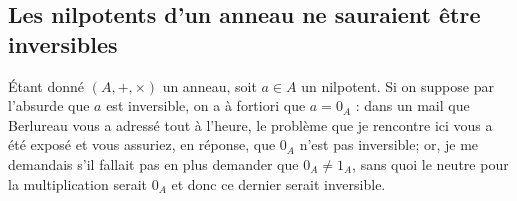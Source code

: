 \documentclass[17pt]{article}
\begin{document}
	\subsection*{Les nilpotents d'un anneau ne sauraient être inversibles}
	Étant donné $(A,+,\times)$ un anneau, soit $a\in A$ un nilpotent. Si on suppose par l'absurde que $a$ est inversible, on a à fortiori que $a=0_A$ : dans un mail que Berlureau vous a adressé tout à l'heure, le problème que je rencontre ici vous a été exposé et vous assuriez, en réponse, que $0_A$ n'est pas inversible; or, je me demandais s'il fallait pas en plus demander que $0_A\neq 1_A$, sans quoi le neutre pour la multiplication serait $0_A$ et donc ce dernier serait inversible.
\end{document}
